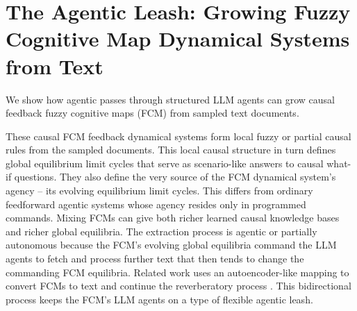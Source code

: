 \documentclass[runningheads]{llncs}
\begin{document}
\section{The Agentic Leash:  Growing Fuzzy Cognitive Map Dynamical Systems from Text}

We show how agentic passes through structured LLM agents can grow causal feedback fuzzy cognitive maps (FCM) from sampled text documents. 

These causal FCM feedback dynamical systems form local fuzzy or partial causal rules from the sampled documents.
This local causal structure in turn defines global equilibrium limit cycles that serve as scenario-like answers to causal what-if questions. 
They also define the very source of the FCM dynamical system's agency -- its evolving equilibrium limit cycles.
This differs from ordinary feedforward agentic systems whose agency resides only in programmed commands.
Mixing FCMs can give both richer learned causal knowledge bases and richer global equilibria.
The extraction process is agentic \cite{acharya2025agentic} or partially autonomous because the FCM's evolving global equilibria command the LLM agents to fetch and process further text that then tends to change the commanding FCM equilibria.  
Related work uses an autoencoder-like mapping to convert FCMs to text and continue the reverberatory process \cite{panda2025causal}.
This bidirectional process keeps the FCM's LLM agents on a type of flexible agentic leash.
\end{document}
